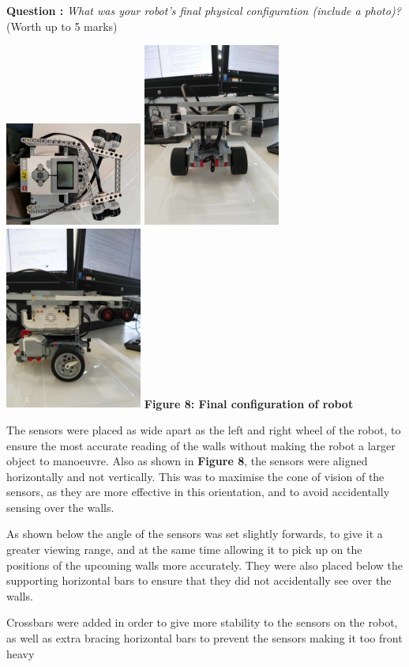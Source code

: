 \documentclass[hidelinks,a4paper,11pt]{article}
\newcounter{question}
\newcommand\myq{\refstepcounter{question}\thequestion}
\begin{document}
{\bfseries Question \myq:}  \emph{What was your robot's final physical configuration (include a
photo)?} (Worth up to 5 marks)\\
\begin{mdframed}
\begin{center}
\includegraphics[angle=90, width=4.5cm]{tilt1.jpg}
\includegraphics[width=4.5cm]{tilt2.jpg}
\includegraphics[width=4.5cm]{tilt3.jpg}
\textbf{Figure 8: Final configuration of robot}
\end{center}
The sensors were placed as wide apart as the left and right wheel of the robot, to ensure the most
accurate reading of the walls without making the robot a larger object to manoeuvre. Also as shown
in \textbf{Figure 8}, the sensors were aligned horizontally and not vertically. This was to maximise
the cone of vision of the sensors, as they are more effective in this orientation, and to avoid
accidentally sensing over the walls.

As shown below the angle of the sensors was set slightly forwards, to give it a greater viewing
range, and at the same time allowing it to pick up on the positions of the upcoming walls more
accurately. They were also placed below the supporting horizontal bars to ensure that they did not
accidentally see over the walls.

Crossbars were added in order to give more stability  to the sensors on the robot, as well as extra
bracing horizontal bars to prevent the sensors making it too front heavy
\end{mdframed}
\vspace*{\baselineskip}
\end{document}

